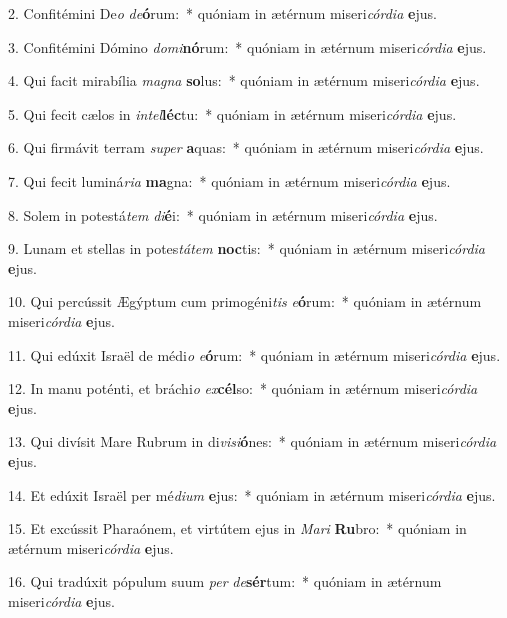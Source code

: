 2. Confitémini De\textit{o} \textit{de}\textbf{ó}rum:~*  quóniam in ætérnum miseri\textit{cór}\textit{di}\textit{a} \textbf{e}jus.\

3. Confitémini Dómino \textit{do}\textit{mi}\textbf{nó}rum:~*  quóniam in ætérnum miseri\textit{cór}\textit{di}\textit{a} \textbf{e}jus.\

4. Qui facit mirabília \textit{ma}\textit{gna} \textbf{so}lus:~*  quóniam in ætérnum miseri\textit{cór}\textit{di}\textit{a} \textbf{e}jus.\

5. Qui fecit cælos in \textit{in}\textit{tel}\textbf{léc}tu:~*  quóniam in ætérnum miseri\textit{cór}\textit{di}\textit{a} \textbf{e}jus.\

6. Qui firmávit terram \textit{su}\textit{per} \textbf{a}quas:~*  quóniam in ætérnum miseri\textit{cór}\textit{di}\textit{a} \textbf{e}jus.\

7. Qui fecit luminá\textit{ri}\textit{a} \textbf{ma}gna:~*  quóniam in ætérnum miseri\textit{cór}\textit{di}\textit{a} \textbf{e}jus.\

8. Solem in potestá\textit{tem} \textit{di}\textbf{é}i:~*  quóniam in ætérnum miseri\textit{cór}\textit{di}\textit{a} \textbf{e}jus.\

9. Lunam et stellas in potes\textit{tá}\textit{tem} \textbf{noc}tis:~*  quóniam in ætérnum miseri\textit{cór}\textit{di}\textit{a} \textbf{e}jus.\

10. Qui percússit Ægýptum cum primogéni\textit{tis} \textit{e}\textbf{ó}rum:~*  quóniam in ætérnum miseri\textit{cór}\textit{di}\textit{a} \textbf{e}jus.\

11. Qui edúxit Israël de médi\textit{o} \textit{e}\textbf{ó}rum:~*  quóniam in ætérnum miseri\textit{cór}\textit{di}\textit{a} \textbf{e}jus.\

12. In manu poténti, et bráchi\textit{o} \textit{ex}\textbf{cél}so:~*  quóniam in ætérnum miseri\textit{cór}\textit{di}\textit{a} \textbf{e}jus.\

13. Qui divísit Mare Rubrum in di\textit{vi}\textit{si}\textbf{ó}nes:~*  quóniam in ætérnum miseri\textit{cór}\textit{di}\textit{a} \textbf{e}jus.\

14. Et edúxit Israël per mé\textit{di}\textit{um} \textbf{e}jus:~*  quóniam in ætérnum miseri\textit{cór}\textit{di}\textit{a} \textbf{e}jus.\

15. Et excússit Pharaónem, et virtútem ejus in \textit{Ma}\textit{ri} \textbf{Ru}bro:~*  quóniam in ætérnum miseri\textit{cór}\textit{di}\textit{a} \textbf{e}jus.\

16. Qui tradúxit pópulum suum \textit{per} \textit{de}\textbf{sér}tum:~*  quóniam in ætérnum miseri\textit{cór}\textit{di}\textit{a} \textbf{e}jus.\

